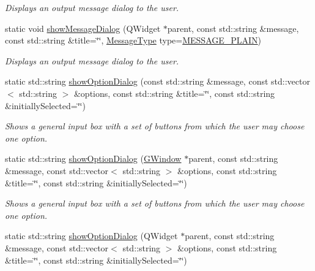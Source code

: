 \begin{DoxyCompactItemize}
\begin{DoxyCompactList}\small\item\em Displays an output message dialog to the user. \end{DoxyCompactList}\item 
static void \mbox{\hyperlink{classGOptionPane_a2284af6ada78d0ddedfc5c2eaeea2d9b}{show\+Message\+Dialog}} (Q\+Widget $\ast$parent, const std\+::string \&message, const std\+::string \&title=\char`\"{}\char`\"{}, \mbox{\hyperlink{classGOptionPane_ac6606ebe91c8ac66a2c314c79f5ab013}{Message\+Type}} type=\mbox{\hyperlink{classGOptionPane_ac6606ebe91c8ac66a2c314c79f5ab013ac03a17c74c589b004d166532958a6196}{M\+E\+S\+S\+A\+G\+E\+\_\+\+P\+L\+A\+IN}})
\begin{DoxyCompactList}\small\item\em Displays an output message dialog to the user. \end{DoxyCompactList}\item 
static std\+::string \mbox{\hyperlink{classGOptionPane_a97736128c635f83e29c7e9ca5721c497}{show\+Option\+Dialog}} (const std\+::string \&message, const std\+::vector$<$ std\+::string $>$ \&options, const std\+::string \&title=\char`\"{}\char`\"{}, const std\+::string \&initially\+Selected=\char`\"{}\char`\"{})
\begin{DoxyCompactList}\small\item\em Shows a general input box with a set of buttons from which the user may choose one option. \end{DoxyCompactList}\item 
static std\+::string \mbox{\hyperlink{classGOptionPane_a7a5687c65c026d0b8ec1d6eb3307c152}{show\+Option\+Dialog}} (\mbox{\hyperlink{classGWindow}{G\+Window}} $\ast$parent, const std\+::string \&message, const std\+::vector$<$ std\+::string $>$ \&options, const std\+::string \&title=\char`\"{}\char`\"{}, const std\+::string \&initially\+Selected=\char`\"{}\char`\"{})
\begin{DoxyCompactList}\small\item\em Shows a general input box with a set of buttons from which the user may choose one option. \end{DoxyCompactList}\item 
static std\+::string \mbox{\hyperlink{classGOptionPane_acbb5578b03bc2715c63b175f6f7ffa24}{show\+Option\+Dialog}} (Q\+Widget $\ast$parent, const std\+::string \&message, const std\+::vector$<$ std\+::string $>$ \&options, const std\+::string \&title=\char`\"{}\char`\"{}, const std\+::string \&initially\+Selected=\char`\"{}\char`\"{})

\end{DoxyCompactItemize}
